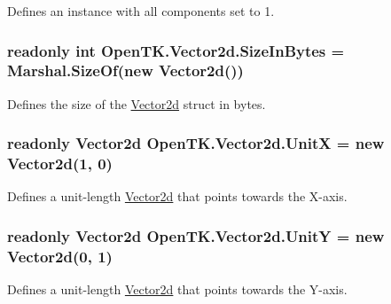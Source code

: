 Defines an instance with all components set to 1. 

\hypertarget{struct_open_t_k_1_1_vector2d_aaea85487e5855f3e18e3820ddb005f7b}{
\subsubsection[{Size\-In\-Bytes}]{\setlength{\rightskip}{0pt plus 5cm}readonly int Open\-T\-K.\-Vector2d.\-Size\-In\-Bytes = Marshal.\-Size\-Of(new {\bf Vector2d}())\hspace{0.3cm}{\ttfamily [static]}}}\label{struct_open_t_k_1_1_vector2d_aaea85487e5855f3e18e3820ddb005f7b}


Defines the size of the \hyperlink{struct_open_t_k_1_1_vector2d}{Vector2d} struct in bytes. 

\hypertarget{struct_open_t_k_1_1_vector2d_aef5769e047c770dcc537be20baf7fdab}{
\subsubsection[{Unit\-X}]{\setlength{\rightskip}{0pt plus 5cm}readonly {\bf Vector2d} Open\-T\-K.\-Vector2d.\-Unit\-X = new {\bf Vector2d}(1, 0)\hspace{0.3cm}{\ttfamily [static]}}}\label{struct_open_t_k_1_1_vector2d_aef5769e047c770dcc537be20baf7fdab}


Defines a unit-\/length \hyperlink{struct_open_t_k_1_1_vector2d}{Vector2d} that points towards the X-\/axis. 

\hypertarget{struct_open_t_k_1_1_vector2d_a3bcd3b007dba58a896c0016ae27c21d2}{
\subsubsection[{Unit\-Y}]{\setlength{\rightskip}{0pt plus 5cm}readonly {\bf Vector2d} Open\-T\-K.\-Vector2d.\-Unit\-Y = new {\bf Vector2d}(0, 1)\hspace{0.3cm}{\ttfamily [static]}}}\label{struct_open_t_k_1_1_vector2d_a3bcd3b007dba58a896c0016ae27c21d2}


Defines a unit-\/length \hyperlink{struct_open_t_k_1_1_vector2d}{Vector2d} that points towards the Y-\/axis. 

